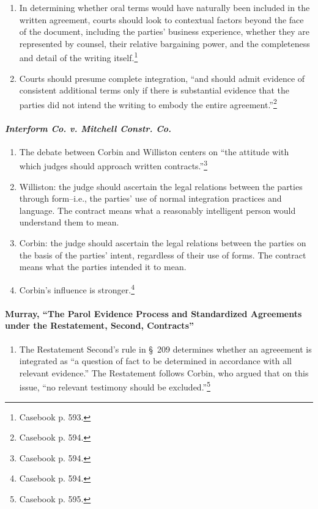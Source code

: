 \begin{enumerate}
    \item In determining whether oral terms would have naturally been included 
    in the written agreement, courts should look to contextual factors beyond 
    the face of the document, including the parties' business experience, 
    whether they are represented by counsel, their relative bargaining power, 
    and the completeness and detail of the writing itself.\footnote{Casebook 
    p. 593.}
    \item Courts should presume complete integration, ``and should admit 
    evidence of consistent additional terms only if there is substantial 
    evidence that the parties did not intend the writing to embody the entire 
    agreement.''\footnote{Casebook p. 594.}
\end{enumerate}

\paragraph{\emph{Interform Co. v. Mitchell Constr. Co.}}

\begin{enumerate}
    \item The debate between Corbin and Williston centers on ``the attitude 
    with which judges should approach written contracts.''\footnote{Casebook 
    p. 594.}
    \item Williston: the judge should ascertain the legal relations between 
    the parties through form--i.e., the parties' use of normal integration 
    practices and language. The contract means what a reasonably intelligent 
    person would understand them to mean.
    \item Corbin: the judge should ascertain the legal relations between the 
    parties on the basis of the parties' intent, regardless of their use of 
    forms. The contract means what the parties intended it to mean.
    \item Corbin's influence is stronger.\footnote{Casebook p. 594.}
\end{enumerate}

\paragraph{Murray, ``The Parol Evidence Process and Standardized Agreements 
under the Restatement, Second, Contracts''}

\begin{enumerate}
    \item The Restatement Second's rule in \S\ 209 determines  whether an 
    agreeement is integrated as ``a question of fact to be determined in 
    accordance with all relevant evidence.'' The Restatement follows Corbin, 
    who argued that on this issue, ``no relevant testimony should be 
    excluded.''\footnote{Casebook p. 595.}
\end{enumerate}

